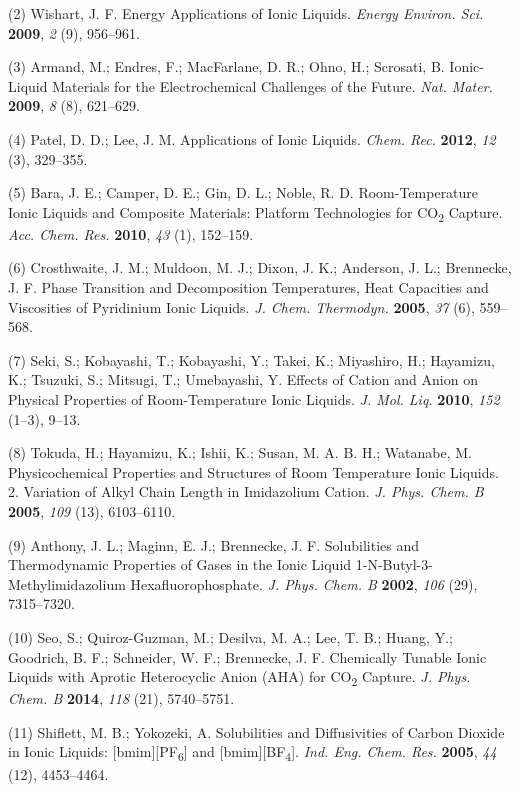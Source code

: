 \documentclass[]{article}
\begin{document}
(2) Wishart, J. F. Energy Applications of Ionic Liquids. \emph{Energy
Environ. Sci.} \textbf{2009}, \emph{2} (9), 956--961.

(3) Armand, M.; Endres, F.; MacFarlane, D. R.; Ohno, H.; Scrosati, B.
Ionic-Liquid Materials for the Electrochemical Challenges of the Future.
\emph{Nat. Mater.} \textbf{2009}, \emph{8} (8), 621--629.

(4) Patel, D. D.; Lee, J. M. Applications of Ionic Liquids. \emph{Chem.
Rec.} \textbf{2012}, \emph{12} (3), 329--355.

(5) Bara, J. E.; Camper, D. E.; Gin, D. L.; Noble, R. D.
Room-Temperature Ionic Liquids and Composite Materials: Platform
Technologies for CO\textsubscript{2} Capture. \emph{Acc. Chem. Res.}
\textbf{2010}, \emph{43} (1), 152--159.

(6) Crosthwaite, J. M.; Muldoon, M. J.; Dixon, J. K.; Anderson, J. L.;
Brennecke, J. F. Phase Transition and Decomposition Temperatures, Heat
Capacities and Viscosities of Pyridinium Ionic Liquids. \emph{J. Chem.
Thermodyn.} \textbf{2005}, \emph{37} (6), 559--568.

(7) Seki, S.; Kobayashi, T.; Kobayashi, Y.; Takei, K.; Miyashiro, H.;
Hayamizu, K.; Tsuzuki, S.; Mitsugi, T.; Umebayashi, Y. Effects of Cation
and Anion on Physical Properties of Room-Temperature Ionic Liquids.
\emph{J. Mol. Liq.} \textbf{2010}, \emph{152} (1--3), 9--13.

(8) Tokuda, H.; Hayamizu, K.; Ishii, K.; Susan, M. A. B. H.; Watanabe,
M. Physicochemical Properties and Structures of Room Temperature Ionic
Liquids. 2. Variation of Alkyl Chain Length in Imidazolium Cation.
\emph{J. Phys. Chem. B} \textbf{2005}, \emph{109} (13), 6103--6110.

(9) Anthony, J. L.; Maginn, E. J.; Brennecke, J. F. Solubilities and
Thermodynamic Properties of Gases in the Ionic Liquid
1-N-Butyl-3-Methylimidazolium Hexafluorophosphate. \emph{J. Phys. Chem.
B} \textbf{2002}, \emph{106} (29), 7315--7320.

(10) Seo, S.; Quiroz-Guzman, M.; Desilva, M. A.; Lee, T. B.; Huang, Y.;
Goodrich, B. F.; Schneider, W. F.; Brennecke, J. F. Chemically Tunable
Ionic Liquids with Aprotic Heterocyclic Anion (AHA) for
CO\textsubscript{2} Capture. \emph{J. Phys. Chem. B} \textbf{2014},
\emph{118} (21), 5740--5751.

(11) Shiflett, M. B.; Yokozeki, A. Solubilities and Diffusivities of
Carbon Dioxide in Ionic Liquids: {[}bmim{]}{[}PF\textsubscript{6}{]} and
{[}bmim{]}{[}BF\textsubscript{4}{]}. \emph{Ind. Eng. Chem. Res.}
\textbf{2005}, \emph{44} (12), 4453--4464.
\end{document}
